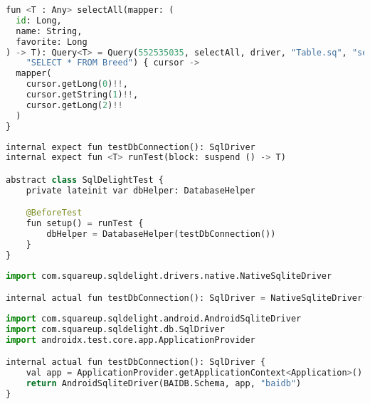 \begin{lstlisting}[style=light, language=Python,label={lst:table_sq_gen},caption=Generate code]
fun <T : Any> selectAll(mapper: (
  id: Long,
  name: String,
  favorite: Long
) -> T): Query<T> = Query(552535035, selectAll, driver, "Table.sq", "selectAll",
    "SELECT * FROM Breed") { cursor ->
  mapper(
    cursor.getLong(0)!!,
    cursor.getString(1)!!,
    cursor.getLong(2)!!
  )
}
\end{lstlisting}

\begin{lstlisting}[style=light, language=Python,label={lst:kotin_test_common},caption=Common Unit Test]
internal expect fun testDbConnection(): SqlDriver
internal expect fun <T> runTest(block: suspend () -> T)

abstract class SqlDelightTest {
    private lateinit var dbHelper: DatabaseHelper

    @BeforeTest
    fun setup() = runTest {
        dbHelper = DatabaseHelper(testDbConnection())
    }
}
\end{lstlisting}

\begin{lstlisting}[style=light, language=Python,label={lst:kotin_test_ios},caption=iOS SQLDriver]
import com.squareup.sqldelight.drivers.native.NativeSqliteDriver

internal actual fun testDbConnection(): SqlDriver = NativeSqliteDriver(BAIDB.Schema, "baidb")
\end{lstlisting}

\begin{lstlisting}[style=light, language=Python,label={lst:kotin_test_android},caption=Android SQLDriver]
import com.squareup.sqldelight.android.AndroidSqliteDriver
import com.squareup.sqldelight.db.SqlDriver
import androidx.test.core.app.ApplicationProvider

internal actual fun testDbConnection(): SqlDriver {
    val app = ApplicationProvider.getApplicationContext<Application>()
    return AndroidSqliteDriver(BAIDB.Schema, app, "baidb")
}
\end{lstlisting}

